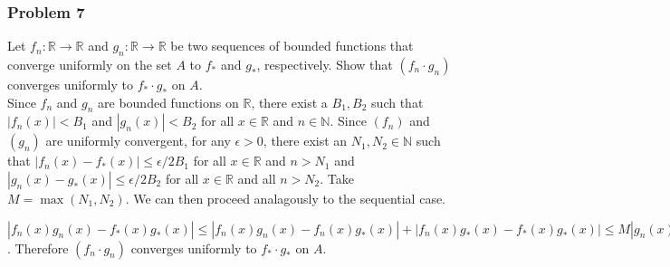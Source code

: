 \documentclass{article}
\newcommand{\N}{\mathbb{N}}
\newcommand{\R}{\mathbb{R}}
\begin{document}
\subsubsection*{Problem 7}
Let $f_n: \R \rightarrow \R$ and $g_n : \R \rightarrow \R$ be two sequences of bounded functions that converge uniformly on the set $A$ to $f_*$ and $g_*$, respectively. Show that $(f_n \cdot g_n)$ converges uniformly to $f_* \cdot g_*$ on $A$.\\

Since $f_n$ and $g_n$ are bounded functions on $\R$, there exist a $B_1, B_2$ such that $|f_n(x)| < B_1$ and $|g_n(x)| < B_2$ for all $x \in \R$ and $n \in \N$. Since $(f_n)$ and $(g_n)$ are uniformly convergent, for any $\epsilon > 0$, there exist an $N_1, N_2 \in \N$ such that $|f_n(x) - f_*(x)| \leq \epsilon / 2B_1$ for all $x \in \R$ and $n > N_1$ and $|g_n(x) - g_*(x)| \leq \epsilon / 2B_2$ for all $x \in \R$ and all $n > N_2$. Take $M = \max(N_1, N_2)$. We can then proceed analagously to the sequential case.

$|f_n(x)g_n(x) - f_*(x)g_*(x)| \leq |f_n(x)g_n(x) - f_n(x)g_*(x)| + |f_n(x)g_*(x) - f_*(x)g_*(x)| \leq M|g_n(x) - g_*(x)| + M|f_n(x) - f_*(x)| < M\frac{\epsilon}{2M} + M\frac{\epsilon}{2M} = \epsilon$. Therefore $(f_n \cdot g_n)$ converges uniformly to $f_* \cdot g_*$ on $A$.
\end{document}
